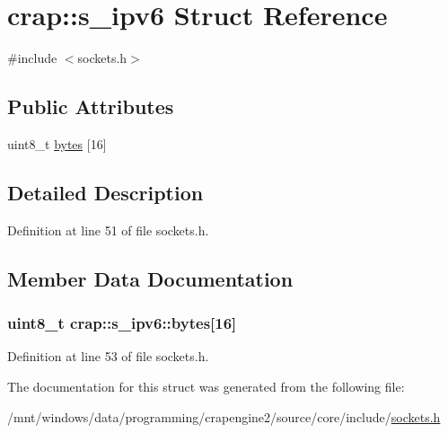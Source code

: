 \hypertarget{structcrap_1_1s__ipv6}{}\section{crap\+:\+:s\+\_\+ipv6 Struct Reference}
\label{structcrap_1_1s__ipv6}


{\ttfamily \#include $<$sockets.\+h$>$}

\subsection*{Public Attributes}
\begin{DoxyCompactItemize}
\item 
uint8\+\_\+t \hyperlink{structcrap_1_1s__ipv6_a331fa40870dacdaa019acaeafb22a154}{bytes} \mbox{[}16\mbox{]}
\end{DoxyCompactItemize}


\subsection{Detailed Description}


Definition at line 51 of file sockets.\+h.



\subsection{Member Data Documentation}
\hypertarget{structcrap_1_1s__ipv6_a331fa40870dacdaa019acaeafb22a154}{}
\subsubsection[{bytes}]{\setlength{\rightskip}{0pt plus 5cm}uint8\+\_\+t crap\+::s\+\_\+ipv6\+::bytes\mbox{[}16\mbox{]}}\label{structcrap_1_1s__ipv6_a331fa40870dacdaa019acaeafb22a154}


Definition at line 53 of file sockets.\+h.



The documentation for this struct was generated from the following file\+:\begin{DoxyCompactItemize}
\item 
/mnt/windows/data/programming/crapengine2/source/core/include/\hyperlink{sockets_8h}{sockets.\+h}\end{DoxyCompactItemize}
